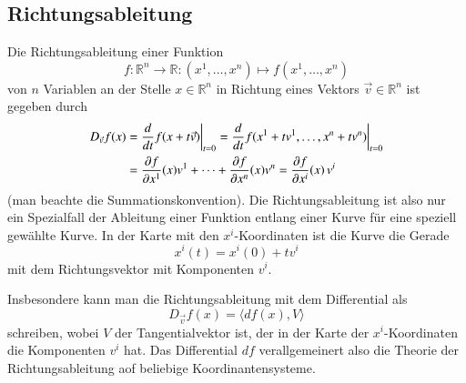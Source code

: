 \subsection{Richtungsableitung}
Die Richtungsableitung einer Funktion 
%
\[
f\colon
\mathbb{R}^n\to\mathbb{R}
:
(x^1,\dots,x^n)\mapsto f(x^1,\dots,x^n)
\]
von $n$ Variablen an der Stelle $x\in\mathbb{R}^n$ in Richtung
eines Vektors $\vec{v}\in\mathbb{R}^n$ ist gegeben durch
\begin{align}
D_{\vec{v}}f(x)
&=
\frac{d}{dt}
f(x+t\vec{v})
\bigg|_{t=0}
=
\frac{d}{dt}
f(x^1+tv^1,\dots,x^n+tv^n)\bigg|_{t=0}
\notag
\\
&=
\frac{\partial f}{\partial x^1}(x)v^1
+
\dots
+
\frac{\partial f}{\partial x^n}(x)v^n
=
\frac{\partial f}{\partial x^i}(x)\,v^i
\label{buch:kurvenintegral:differential:eqn:ricthungsableitung}
\end{align}
(man beachte die Summationskonvention).
Die Richtungsableitung ist also nur ein Spezialfall der Ableitung
einer Funktion entlang einer Kurve für eine speziell gewählte
Kurve.
In der Karte mit den $x^i$-Koordinaten ist die Kurve die Gerade
\[
x^i(t) = x^i(0) + tv^i
\]
mit dem Richtungsvektor mit Komponenten $v^i$.
%

Insbesondere kann man die Richtungsableitung mit dem Differential
als
\[
D_{\vec{v}}f(x)
=
\langle
df(x),
V
\rangle
\]
schreiben, wobei $V$ der Tangentialvektor ist, der in der Karte
der $x^i$-Koordinaten die Komponenten $v^i$ hat.
Das Differential $df$ verallgemeinert also die Theorie der 
Richtungsableitung aof beliebige Koordinantensysteme.


%
%
